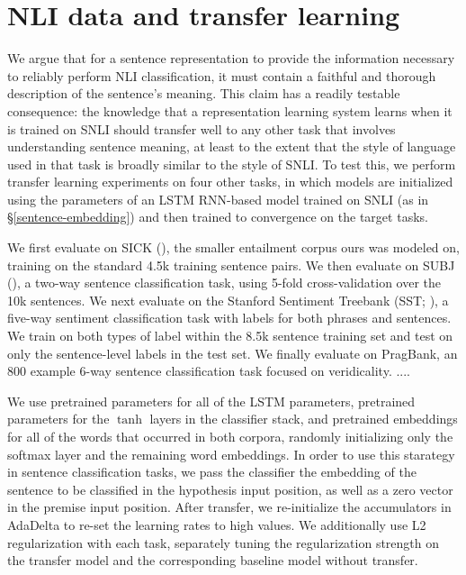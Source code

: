 \section{NLI data and transfer learning}\label{sec:transfer}

We argue that for a sentence representation to provide the information necessary to reliably perform NLI classification, it must contain a faithful and thorough description of the sentence's meaning. This claim has a readily testable consequence: the knowledge that a representation learning system learns when it is trained on SNLI should transfer well to any other task that involves understanding sentence meaning, at least to the extent that the style of language used in that task is broadly similar to the style of SNLI. To test this, we perform transfer learning experiments on four other tasks, in which models are initialized using the parameters of an LSTM RNN-based model trained on SNLI (as in \S\ref{sentence-embedding}) and then trained to convergence on the target tasks. 

We first evaluate on SICK (\citealt{marelli2014sick}), the smaller entailment corpus ours was modeled on, training on the standard 4.5k training sentence pairs. We then evaluate on SUBJ (\citealt{pang2004sentimental}), a two-way sentence classification task, using 5-fold cross-validation over the 10k sentences. We next evaluate on the Stanford Sentiment Treebank (SST; \citealt{socher2013acl1}), a five-way sentiment classification task with labels for both phrases and sentences. We train on both types of label within the 8.5k sentence training set and test on only the sentence-level labels in the test set. We finally evaluate on PragBank, an 800 example 6-way sentence classification task focused on veridicality.  ....
\noindent{}

We use pretrained parameters for all of the LSTM parameters, pretrained parameters for the $\tanh$ layers in the classifier stack, and pretrained embeddings for all of the words that occurred in both corpora, randomly initializing only the softmax layer and the remaining word embeddings. In order to use this starategy in sentence classification tasks, we pass the classifier the embedding of the sentence to be classified in the hypothesis input position, as well as a zero vector in the premise input position. After transfer, we re-initialize the accumulators in AdaDelta to re-set the learning rates to high values. We additionally use L2 regularization with each task, separately tuning the regularization strength on the transfer model and the corresponding baseline model without transfer.

